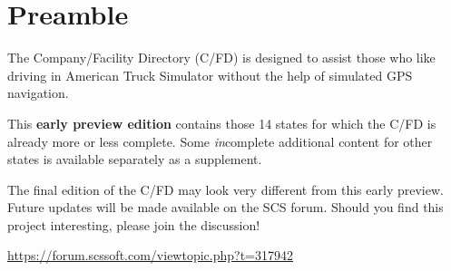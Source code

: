 \maketitle

\vspace{5mm}
\section*{Preamble}

{
\justifying

The Company/Facility Directory (C/FD) is designed to assist those who like driving in American Truck Simulator without the help of simulated GPS navigation.

This \textbf{early preview edition} contains those 14 states for which the C/FD is already more or less complete.
Some \emph{in}complete additional content for other states is available separately as a supplement.

The final edition of the C/FD may look very different from this early preview.
Future updates will be made available on the SCS forum.
Should you find this project interesting, please join the discussion!

\centering \vspace{1ex}
\url{https://forum.scssoft.com/viewtopic.php?t=317942} \par
}

\copyrightblock
\thispagestyle{empty}

\tableofcontents
\thispagestyle{empty}
